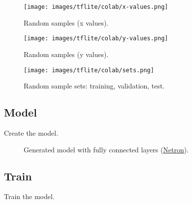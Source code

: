 \documentclass[aspectratio=169]{beamer}
\begin{document}
\begin{frame}
    \begin{figure}
        \texttt{[image: images/tflite/colab/x-values.png]}
        \caption{Random samples (x values).}
    \end{figure}
\end{frame}

\begin{frame}
    \begin{figure}
        \texttt{[image: images/tflite/colab/y-values.png]}
        \caption{Random samples (y values).}
    \end{figure}
\end{frame}

\begin{frame}
    \begin{figure}
        \texttt{[image: images/tflite/colab/sets.png]}
        \caption{Random sample sets: training, validation, test.}
    \end{figure}
\end{frame}

\subsection{Model}

\begin{frame}
    \begin{listing}[H]
        \caption{Create the model.}
        \label{lst:tflite:sinewave:model}
    \end{listing}
\end{frame}

\begin{frame}
    \begin{figure}
        \caption{Generated model with fully connected layers (\href{https://github.com/lutzroeder/netron}{Netron}).}
    \end{figure}
\end{frame}

\subsection{Train}

\begin{frame}
    \begin{listing}[H]
        \caption{Train the model.}
        \label{lst:tflite:sinewave:train}
    \end{listing}
\end{frame}
\end{document}
